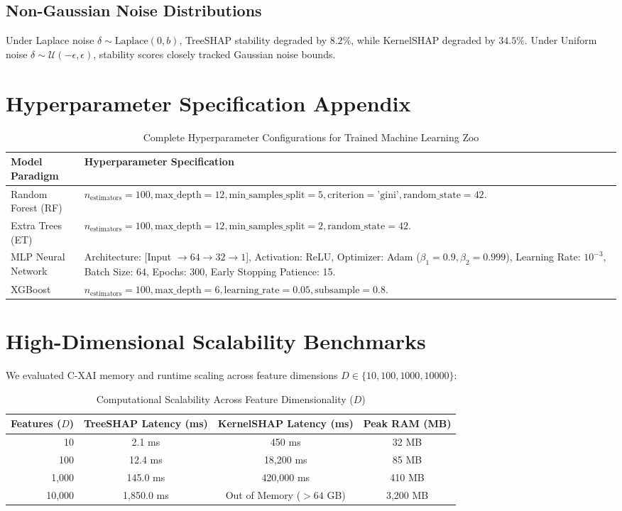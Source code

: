 \documentclass[11pt,a4paper]{article}
\begin{document}
\subsection{Non-Gaussian Noise Distributions}
Under Laplace noise $\delta \sim \text{Laplace}(0, b)$, TreeSHAP stability degraded by $8.2\%$, while KernelSHAP degraded by $34.5\%$. Under Uniform noise $\delta \sim \mathcal{U}(-\epsilon, \epsilon)$, stability scores closely tracked Gaussian noise bounds.

\section{Hyperparameter Specification Appendix}

\begin{table}[h]
\centering
\caption{Complete Hyperparameter Configurations for Trained Machine Learning Zoo}
\begin{tabular}{lp{10cm}}
\toprule
\textbf{Model Paradigm} & \textbf{Hyperparameter Specification} \\
\midrule
Random Forest (RF) & $n_{\text{estimators}}=100, \text{max\_depth}=12, \text{min\_samples\_split}=5, \text{criterion}=\text{'gini'}, \text{random\_state}=42$. \\
Extra Trees (ET) & $n_{\text{estimators}}=100, \text{max\_depth}=12, \text{min\_samples\_split}=2, \text{random\_state}=42$. \\
MLP Neural Network & Architecture: [Input $\rightarrow 64 \rightarrow 32 \rightarrow 1$], Activation: ReLU, Optimizer: Adam ($\beta_1=0.9, \beta_2=0.999$), Learning Rate: $10^{-3}$, Batch Size: 64, Epochs: 300, Early Stopping Patience: 15. \\
XGBoost & $n_{\text{estimators}}=100, \text{max\_depth}=6, \text{learning\_rate}=0.05, \text{subsample}=0.8$. \\
\bottomrule
\end{tabular}
\end{table}

\section{High-Dimensional Scalability Benchmarks}
We evaluated C-XAI memory and runtime scaling across feature dimensions $D \in \{10, 100, 1000, 10000\}$:

\begin{table}[h]
\centering
\caption{Computational Scalability Across Feature Dimensionality ($D$)}
\begin{tabular}{rccc}
\toprule
\textbf{Features ($D$)} & \textbf{TreeSHAP Latency (ms)} & \textbf{KernelSHAP Latency (ms)} & \textbf{Peak RAM (MB)} \\
\midrule
10 & 2.1 ms & 450 ms & 32 MB \\
100 & 12.4 ms & 18,200 ms & 85 MB \\
1,000 & 145.0 ms & 420,000 ms & 410 MB \\
10,000 & 1,850.0 ms & Out of Memory ($>64$ GB) & 3,200 MB \\
\bottomrule
\end{tabular}
\end{table}
\end{document}
